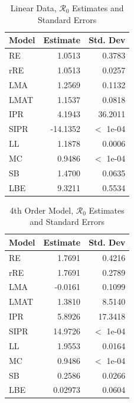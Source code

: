 \documentclass[12pt]{article}
\newcommand{\rr}{\ensuremath{\mathcal{R}_0}}
\begin{document}
\begin{table}[H]
	
	\centering
	\begin{tabular}[t]{l|r|r}
		\hline
		Model & Estimate & Std. Dev\\
		\hline
		RE & 1.0513 & 0.3783\\
		\hline
		rRE & 1.0513 & 0.0257\\
		\hline
		LMA & 1.2569 & 0.1132\\
		\hline
		LMAT & 1.1537 & 0.0818\\
		\hline
		IPR & 4.1943 & 36.2011\\
		\hline
		SIPR & -14.1352 & $<$ 1e-04\\
		\hline
		LL & 1.1878 & 0.0006\\
		\hline
		MC & 0.9486 & $<$ 1e-04\\
		\hline
		SB & 1.4700 & 0.0635\\
		\hline
		LBE & 9.3211 & 0.5534\\
		\hline
	\end{tabular}
	\caption{Linear Data, $\rr$ Estimates and Standard Errors}
\end{table}

\begin{table}[H]
	
	
	\centering
	\begin{tabular}[t]{l|r|r}
		\hline
		Model & Estimate & Std. Dev\\
		\hline
		RE & 1.7691 & 0.4216\\
		\hline
		rRE & 1.7691 & 0.2789\\
		\hline
		LMA & -0.0161 & 0.1099\\
		\hline
		LMAT & 1.3810 & 8.5140\\
		\hline
		IPR & 5.8926 & 17.3418\\
		\hline
		SIPR & 14.9726 & $<$ 1e-04\\
		\hline
		LL & 1.9553 & 0.0164\\
		\hline
		MC & 0.9486 & $<$ 1e-04\\
		\hline
		SB & 0.2586 & 0.0266\\
		\hline
		LBE & 0.02973 & 0.0604\\
		\hline
	\end{tabular}
	\caption{4th Order Model, $\rr$ Estimates and Standard Errors}
\end{table}
\end{document}
